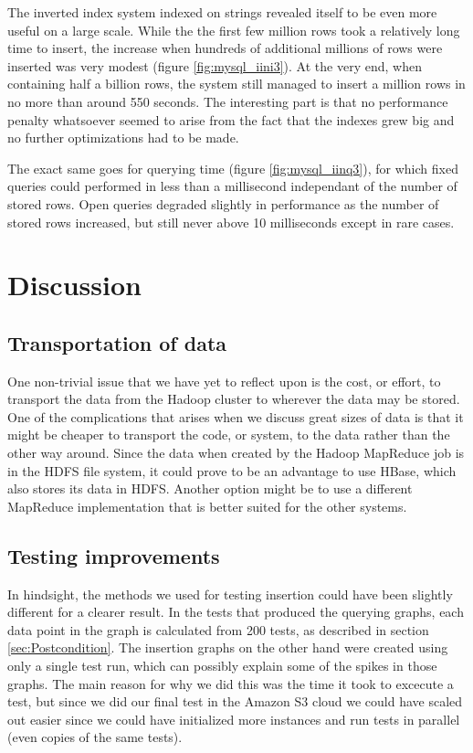 The inverted index system indexed on strings revealed itself to be even more useful on a large scale. While the the first few million rows took a relatively long time to insert, the increase when hundreds of additional millions of rows were inserted was very modest (figure \ref{fig:mysql_iini3}). At the very end, when containing half a billion rows, the system still managed to insert a million rows in no more than around 550 seconds. The interesting part is that no performance penalty whatsoever seemed to arise from the fact that the indexes grew big and no further optimizations had to be made.

The exact same goes for querying time (figure \ref{fig:mysql_iinq3}), for which fixed queries could performed in less than a millisecond independant of the number of stored rows. Open queries degraded slightly in performance as the number of stored rows increased, but still never above 10 milliseconds except in rare cases.

\pagebreak

\chapter{Discussion}

\section{Transportation of data}
One non-trivial issue that we have yet to reflect upon is the cost, or effort, to transport the data from the Hadoop cluster to wherever the data may be stored. One of the complications that arises when we discuss great sizes of data is that it might be cheaper to transport the code, or system, to the data rather than the other way around. Since the data when created by the Hadoop MapReduce job is in the HDFS file system, it could prove to be an advantage to use HBase, which also stores its data in HDFS. Another option might be to use a different MapReduce implementation that is better suited for the other systems.

\section{Testing improvements}
In hindsight, the methods we used for testing insertion could have been slightly different for a clearer result. In the tests that produced the querying graphs, each data point in the graph is calculated from 200 tests, as described in section \ref{sec:Postcondition}. The insertion graphs on the other hand were created using only a single test run, which can possibly explain some of the spikes in those graphs. The main reason for why we did this was the time it took to excecute a test, but since we did our final test in the Amazon S3 cloud we could have scaled out easier since we could have initialized more instances and run tests in parallel (even copies of the same tests).

